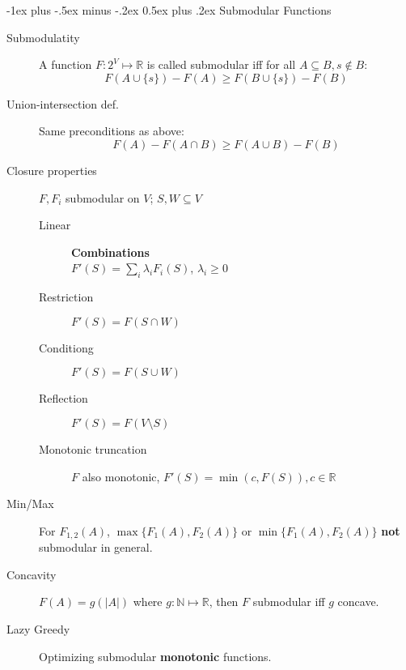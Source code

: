 \documentclass[11pt,landscape]{article}
\makeatletter
\renewcommand{\subsection}{\@startsection{subsection}{2}{0mm}%
                                {-1ex plus -.5ex minus -.2ex}%
                                {0.5ex plus .2ex}%
                                {\color{subsectionColor}\normalfont\normalsize\bfseries}}
\makeatother
\begin{document}
\begin{multicols}{3}
\subsection{Submodular Functions}
\begin{description}
    \item[Submodulatity] A function $F: 2^V \mapsto \mathbb{R}$ is called submodular iff for all $A \subseteq B, s \notin B$:
        $$F(A \cup \{s\}) - F(A) \geq F(B \cup \{s\}) - F(B)$$
    \item[Union-intersection def.] Same preconditions as above: $$F(A) - F(A\cap B) \geq F(A\cup B) - F(B)$$
    \item[Closure properties] $F, F_i$ submodular on $V$; $S, W \subseteq V$
    \begin{description}
        \item[Linear] \textbf{Combinations}\\ $F'(S) = \sum_{i} \lambda_i F_i(S)$, $\lambda_i \geq 0$
        \item[Restriction] $F'(S) = F(S \cap W)$
        \item[Conditiong] $F'(S) = F(S \cup W)$
        \item[Reflection] $F'(S) = F(V \setminus S)$
        \item[Monotonic truncation] $F$ also monotonic, $F'(S) = \min(c, F(S)), c \in \mathbb{R}$
    \end{description}
    \item[Min/Max] For $F_{1,2}(A)$, $\max \{F_1(A),F_2(A) \}$ or $\min \{F_1(A),F_2(A) \}$ \textbf{not} submodular in general.
    \item[Concavity]
    $F(A) = g(|A|)$ where $g: \mathbb{N} \mapsto \mathbb{R}$, then $F$ submodular iff $g$ concave.
\item[Lazy Greedy] Optimizing submodular \textbf{monotonic} functions.
    \begin{algorithmic}[1]
            \EndIf
        \EndFor
\end{algorithmic}
\end{description}

\end{multicols}
\end{document}
